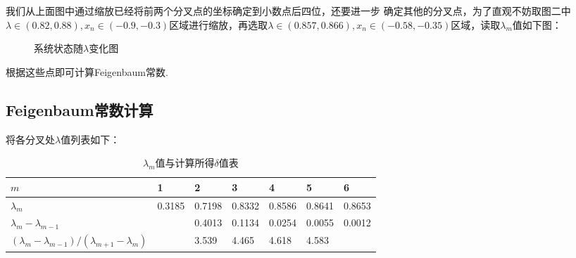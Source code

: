 \documentclass[12pt,a4paper,utf8]{ctexart}
\begin{document}
我们从上面图中通过缩放已经将前两个分叉点的坐标确定到小数点后四位，还要进一步
确定其他的分叉点，为了直观不妨取图二中$\lambda \in(0.82,
0.88), x_n\in(-0.9, -0.3)$区域进行缩放，再选取$\lambda \in (0.857, 0.866), x_n \in (-0.58,
-0.35)$区域，读取$\lambda_m$值如下图：
\begin{figure}[!h]
    \centering
    \hfill
    \caption{系统状态随$\lambda$变化图}
\end{figure}

根据这些点即可计算Feigenbaum常数.

\newpage
\subsection{Feigenbaum常数计算}

将各分叉处$\lambda$值列表如下：
\begin{table}[!h]
\centering
\caption{$\lambda_m$值与计算所得$\delta$值表}
\begin{tabular}{|l|l|l|l|l|l|l|}
\hline
$m$                                                   & 1      & 2      & 3      & 4      & 5      & 6      \\ \hline
$\lambda_m$                                           & 0.3185 & 0.7198 & 0.8332 & 0.8586 & 0.8641 & 0.8653 \\ \hline
$\lambda_m-\lambda_{m-1}$                             &        & 0.4013 & 0.1134 & 0.0254 & 0.0055 & 0.0012 \\ \hline
$(\lambda_m-\lambda_{m-1})/(\lambda_{m+1}-\lambda_m)$ &        & 3.539  & 4.465  & 4.618  & 4.583  &        \\ \hline
\end{tabular}
\end{table}
\end{document}
